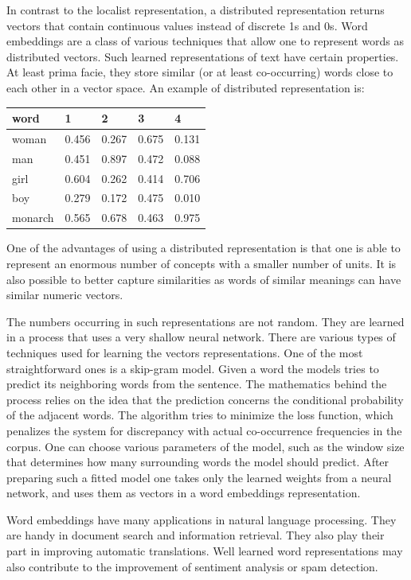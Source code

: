 \documentclass[12pt,]{book}
\begin{document}
In contrast to the localist representation, a distributed representation
returns vectors that contain continuous values instead of discrete 1s
and 0s. Word embeddings are a class of various techniques that allow one
to represent words as distributed vectors. Such learned representations
of text have certain properties. At least prima facie, they store
similar (or at least co-occurring) words close to each other in a vector
space. An example of distributed representation is:

\begin{longtable}[]{@{}lllll@{}}
\toprule
word & 1 & 2 & 3 & 4\tabularnewline
\midrule
\endhead
woman & 0.456 & 0.267 & 0.675 & 0.131\tabularnewline
man & 0.451 & 0.897 & 0.472 & 0.088\tabularnewline
girl & 0.604 & 0.262 & 0.414 & 0.706\tabularnewline
boy & 0.279 & 0.172 & 0.475 & 0.010\tabularnewline
monarch & 0.565 & 0.678 & 0.463 & 0.975\tabularnewline
\bottomrule
\end{longtable}

One of the advantages of using a distributed representation is that one
is able to represent an enormous number of concepts with a smaller
number of units. It is also possible to better capture similarities as
words of similar meanings can have similar numeric vectors.

The numbers occurring in such representations are not random. They are
learned in a process that uses a very shallow neural network. There are
various types of techniques used for learning the vectors
representations. One of the most straightforward ones is a skip-gram
model. Given a word the models tries to predict its neighboring words
from the sentence. The mathematics behind the process relies on the idea
that the prediction concerns the conditional probability of the adjacent
words. The algorithm tries to minimize the loss function, which
penalizes the system for discrepancy with actual co-occurrence
frequencies in the corpus. One can choose various parameters of the
model, such as the window size that determines how many surrounding
words the model should predict. After preparing such a fitted model one
takes only the learned weights from a neural network, and uses them as
vectors in a word embeddings representation.

Word embeddings have many applications in natural language processing.
They are handy in document search and information retrieval. They also
play their part in improving automatic translations. Well learned word
representations may also contribute to the improvement of sentiment
analysis or spam detection.
\end{document}
